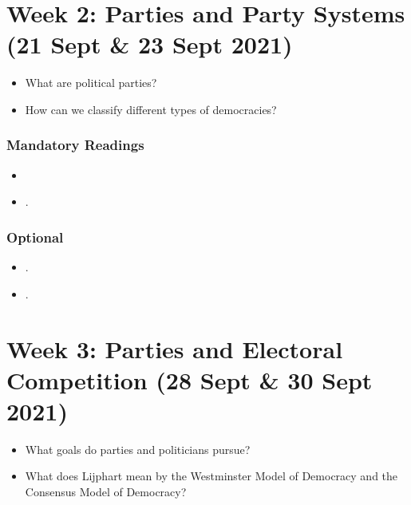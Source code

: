 \documentclass[abstract=on,parskip=full,headings=standardclasses,fontsize=11pt,paper=a4]{scrartcl}
\begin{document}


\section{Week 2: Parties and Party Systems (21 Sept \& 23 Sept 2021)}





\begin{itemize}
\renewcommand\labelitemi{--}
\item  What are political parties?
\item How can we classify different types of democracies?
\end{itemize}

\subsubsection*{Mandatory Readings}
\begin{itemize}
\item {}
\item {}.
\end{itemize}




\subsubsection*{Optional}
\begin{itemize}
\item {}.
\item {}.
\end{itemize}


\section{Week 3:  Parties and Electoral Competition  (28 Sept \& 30 Sept 2021)}

\begin{itemize}
\renewcommand\labelitemi{--}
\item What goals do parties and politicians pursue?
\item What does Lijphart mean by the Westminster Model of Democracy and the Consensus Model of Democracy?
\end{itemize}
\end{document}
